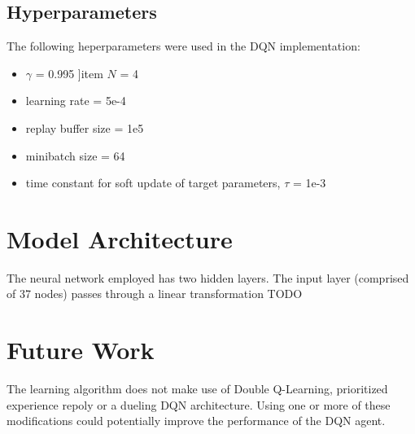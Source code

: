 \documentclass{article}
\begin{document}
\subsection{Hyperparameters}
The following heperparameters were used in the DQN implementation:

\begin{itemize}
\item  $\gamma$ = 0.995
]item $N$ = 4
\item learning rate = 5e-4
\item replay buffer size  = 1e5
\item minibatch size = 64
\item time constant for soft update of target parameters, $\tau$ = 1e-3
\end{itemize}


\section{Model Architecture}
The neural network employed has two hidden layers. The input layer (comprised of 37 nodes) passes through a linear transformation TODO

\section{Future Work}
The learning algorithm does not make use of Double Q-Learning, prioritized experience repoly or a dueling DQN architecture. Using one or more of these modifications could potentially improve the performance of the DQN agent. 



\end{document}
